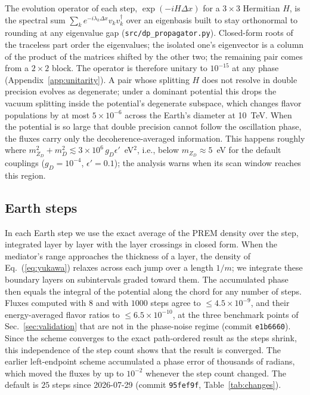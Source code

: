 \documentclass[11pt,a4paper]{article}
\newcommand{\file}[1]{\nolinkurl{#1}}
\newcommand{\mzd}{m_{Z_D}}
\newcommand{\gd}{g_D}
\newcommand{\epsp}{\epsilon'}
\begin{document}
The evolution operator of each step, $\exp(-iH\Delta x)$ for a $3\times3$ Hermitian $H$, is the
spectral sum $\sum_k e^{-i\lambda_k\Delta x}v_kv_k^\dagger$ over an eigenbasis built to stay
orthonormal to rounding at any eigenvalue gap (\file{src/dp_propagator.py}). Closed-form roots
of the traceless part order the eigenvalues; the isolated one's eigenvector is a column of the
product of the matrices shifted by the other two; the remaining pair comes from a $2\times2$
block. The operator is therefore unitary to $10^{-15}$ at any phase
(Appendix~\ref{app:unitarity}). A pair whose splitting $H$ does not resolve in double precision
evolves as degenerate; under a dominant potential this drops the vacuum splitting inside the
potential's degenerate subspace, which changes flavor populations by at most $5\times10^{-6}$
across the Earth's diameter at 10~TeV. When the potential is so large that double precision
cannot follow the oscillation phase, the fluxes carry only the decoherence-averaged
information. This happens roughly where
$\mzd^2 + m_D^2 \lesssim 3\times10^{6}\,\gd\epsp$~eV$^2$, i.e., below $\mzd\approx5$~eV for
the default couplings ($\gd = 10^{-4}$, $\epsp = 0.1$); the analysis warns when its scan window
reaches this region.

\subsection{Earth steps}
\label{sec:earth}

In each Earth step we use the exact average of the PREM density over the step, integrated layer
by layer with the layer crossings in closed form. When the mediator's range approaches the
thickness of a layer, the density of Eq.~(\ref{eq:yukawa}) relaxes across each jump over a length
$1/m$; we integrate these boundary layers on subintervals graded toward them. The accumulated
phase then equals the integral of the potential along the chord for any number of steps. Fluxes computed
with $8$ and with $1000$ steps agree to $\le4.5\times10^{-9}$, and their energy-averaged
flavor ratios to $\le6.5\times10^{-10}$, at the three benchmark points of
Sec.~\ref{sec:validation} that are not in the phase-noise regime (commit \texttt{e1b6660}).
Since the scheme converges to the exact path-ordered result as the steps shrink, this
independence of the step count shows that the result is converged. The earlier
left-endpoint scheme accumulated a phase error of thousands of radians, which moved the fluxes
by up to $10^{-2}$ whenever the step count changed. The default is $25$ steps since
2026-07-29 (commit \texttt{95fef9f}, Table~\ref{tab:changes}).
\end{document}
